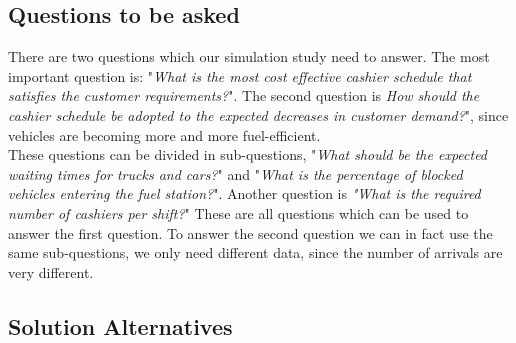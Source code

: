 \subsection{Questions to be asked}
There are two questions which our simulation study need to answer. The most important question is: "\textit{What is the most cost effective cashier schedule that satisfies the customer requirements?}". The second question is \textit{How should the cashier schedule be adopted to the expected decreases in customer demand?}", since vehicles are becoming more and more fuel-efficient.\\
\indent These questions can be divided in sub-questions, "\textit{What should be the expected waiting times for trucks and cars?}" and "\textit{What is the percentage of blocked vehicles entering the fuel station?}". Another question is \textit{"What is the required number of cashiers per shift?}" These are all questions which can be used to answer the first question. To answer the second question we can in fact use the same sub-questions, we only need different data, since the number of arrivals are very different. 

\subsection{Solution Alternatives}
